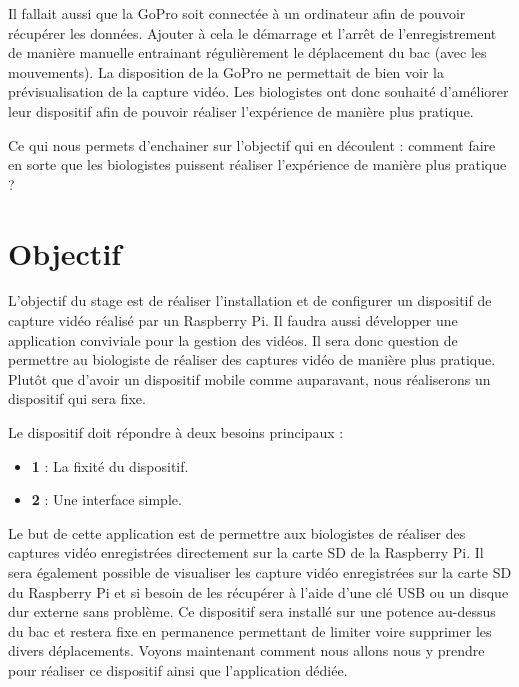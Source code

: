         \vspace{0.2cm}
        
        Il fallait aussi que la GoPro soit connectée à un ordinateur afin de pouvoir récupérer les données.
        Ajouter à cela le démarrage et l'arrêt de l'enregistrement de manière manuelle entrainant régulièrement le déplacement du bac (avec les mouvements). La disposition de la GoPro ne permettait de bien voir la prévisualisation de la capture vidéo.
        Les biologistes ont donc souhaité d'améliorer leur dispositif afin de pouvoir réaliser l'expérience de manière plus pratique.

        \vspace{0.2cm}

        Ce qui nous permets d'enchainer sur l'objectif qui en découlent : comment faire en sorte que les biologistes puissent réaliser l'expérience de manière plus pratique ?

    \section{Objectif}
        L’objectif du stage est de réaliser l’installation et de configurer un dispositif de capture vidéo réalisé par un Raspberry Pi. Il faudra aussi développer une application conviviale pour la gestion des vidéos.
        Il sera donc question de permettre au biologiste de réaliser des captures vidéo de manière plus pratique.
        Plutôt que d'avoir un dispositif mobile comme auparavant, nous réaliserons un dispositif qui sera fixe.



        \begin{flushleft}
            Le dispositif doit répondre à deux besoins principaux :
            \begin{itemize}            
                \item \textbf{1} : La fixité du dispositif.
                \item \textbf{2} : Une interface simple.
            \end{itemize}
        \end{flushleft}
                    
        Le but de cette application est de permettre aux biologistes de réaliser des captures vidéo enregistrées directement sur la carte SD de la Raspberry Pi.
        Il sera également possible de visualiser les capture vidéo enregistrées sur la carte SD du Raspberry Pi et si besoin de les récupérer à l'aide d'une clé USB ou un disque dur externe sans problème.
        Ce dispositif sera installé sur une potence au-dessus du bac et restera fixe en permanence permettant de limiter voire supprimer les divers déplacements. Voyons maintenant comment nous allons nous y prendre pour réaliser ce dispositif ainsi que l'application dédiée.
